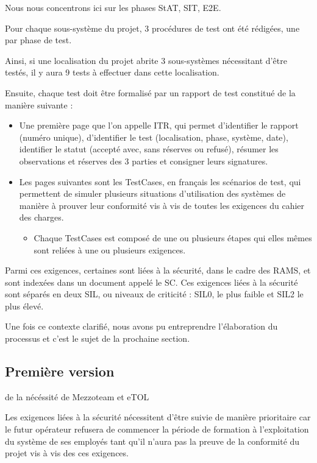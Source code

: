 Nous nous concentrons ici sur les phases \gls{StAT}, \gls{SIT}, \gls{E2E}. 

Pour chaque sous-système du projet, 3 procédures de test ont été rédigées, une par phase de test. 

Ainsi, si une localisation du projet abrite 3 sous-systèmes nécessitant d'être testés, il y aura 9 tests à effectuer dans cette localisation.

Ensuite, chaque test doit être formalisé par un rapport de test constitué de la manière suivante : 

\begin{itemize}
\item Une première page que l'on appelle ITR, qui permet d'identifier le rapport (numéro unique), d'identifier le test (localisation, phase, système, date), identifier le statut (accepté avec, sans réserves ou refusé), résumer les observations et réserves des 3 parties et consigner leurs signatures.
\item Les pages suivantes sont les \gls{TestCases}, en français les scénarios de test, qui permettent de simuler plusieurs situations d'utilisation des systèmes de manière à prouver leur conformité vis à vis de toutes les exigences du cahier des charges.
\begin{itemize}
\item Chaque \gls{TestCases} est composé de une ou plusieurs étapes qui elles mêmes sont reliées à une ou plusieurs exigences.
\end{itemize}
\end{itemize}

Parmi ces exigences, certaines sont liées à la sécurité, dans le cadre des \gls{RAMS}, et sont indexées dans un document appelé le \gls{SC}. Ces exigences liées à la sécurité sont séparés en deux \gls{SIL}, ou niveaux de criticité : SIL0, le plus faible et SIL2 le plus élevé.

Une fois ce contexte clarifié, nous avons pu entreprendre l'élaboration du processus et c'est le sujet de la prochaine section.

\subsection{Première version}
de la nécéssité de Mezzoteam et eTOL

Les exigences liées à la sécurité nécessitent d'être suivie de manière prioritaire car le futur opérateur refusera de commencer la période de formation à l'exploitation du système de ses employés tant qu'il n'aura pas la preuve de la conformité du projet vis à vis des ces exigences.

